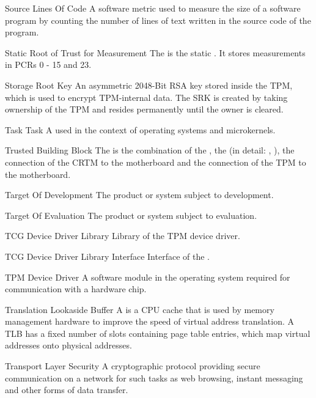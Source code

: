     {Source Lines Of Code}
    {A software metric used to measure the size of a software program by
counting the number of lines of text written in the source code of the program.}

    {Static Root of Trust for Measurement }
    {The \srtm is the static \RTM. It stores measurements in PCRs 0 - 15 and 23.}


    {Storage Root Key}
    {An asymmetric 2048-Bit RSA key stored inside the TPM, which is used to encrypt TPM-internal data.
    The SRK is created by taking ownership of the TPM and resides permanently until the owner is cleared.
    }

\glosentry
    {Task}
    {Task}
    {A \Compartment used in the context of operating systems and microkernels.}

    {Trusted Building Block}
    {The \TBB is the combination of the \RTM, the \TPM (in detail: \RTR, \RTR), the connection 
     of the CRTM to the motherboard and the connection of the TPM to the motherboard.}

    {Target Of Development}
    {The product or system subject to development.}

    {Target Of Evaluation}
    {The product or system subject to evaluation.}

    {TCG Device Driver Library}
    {Library of the TPM device driver.}

    {TCG Device Driver Library Interface}
    {Interface of the \TDDL.}

    {TPM Device Driver}
    {A software module in the operating system required for communication
with a \TPM hardware chip.}

    {Translation Lookaside Buffer}
    {A \TLBlong is a CPU cache that is used by memory management hardware to improve the speed of virtual address translation.
     A TLB has a fixed number of slots containing page table entries, which map virtual addresses onto physical addresses.}

    {Transport Layer Security}
    {A cryptographic protocol providing secure communication on a network for
such tasks as web browsing, instant messaging and other forms of data transfer.}

